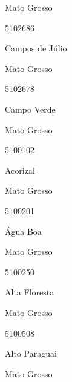 \documentclass[
  letterpaper,
]{report}
\begin{document}
\n    

\n    

\n      

Mato Grosso

\n      

5102686

\n      

Campos de Júlio

\n    

\n    

\n      

Mato Grosso

\n      

5102678

\n      

Campo Verde

\n    

\n    

\n      

Mato Grosso

\n      

5100102

\n      

Acorizal

\n    

\n    

\n      

Mato Grosso

\n      

5100201

\n      

Água Boa

\n    

\n    

\n      

Mato Grosso

\n      

5100250

\n      

Alta Floresta

\n    

\n    

\n      

Mato Grosso

\n      

5100508

\n      

Alto Paraguai

\n    

\n    

\n      

Mato Grosso
\end{document}
